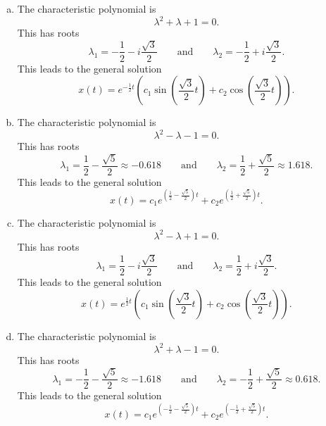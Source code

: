 \documentclass[12pt]{article} %
\begin{document}
\begin{solution}
    \begin{enumerate}[(a)]~
        \item The characteristic polynomial is 
         \[
\lambda^2+\lambda+1=0.
\]
 This has roots
        \[
            \lambda_1 = -\frac{1}{2} -i\frac{\sqrt{3}}{2} \qquad \textrm{and} \qquad \lambda_2 = -\frac{1}{2} + i\frac{\sqrt{3}}{2}.
        \]
    This leads to the general solution
        \[
            \boxed{x(t) = e^{-\frac{1}{2}t} \left(c_1 \sin\left(\frac{\sqrt{3}}{2}t\right) +c_2 \cos\left(\frac{\sqrt{3}}{2}t\right) \right).}
        \]

        \item The characteristic polynomial is 
        \[
            \lambda^2-\lambda-1=0.
        \]
         This has roots
        \[
            \lambda_1 = \frac{1}{2} -\frac{\sqrt{5}}{2} \approx -0.618 \qquad \textrm{and} \qquad \lambda_2 = \frac{1}{2} + \frac{\sqrt{5}}{2} \approx 1.618.
        \]
    This leads to the general solution
        \[
            \boxed{x(t) = c_1 e^{\left(\frac{1}{2}-\frac{\sqrt{5}}{2}\right)t}  +c_2 e^{\left(\frac{1}{2}+\frac{\sqrt{5}}{2}\right)t}.}
        \]

        \item The characteristic polynomial is 
         \[
\lambda^2-\lambda+1=0.
\]
 This has roots
        \[
            \lambda_1 = \frac{1}{2} -i\frac{\sqrt{3}}{2} \qquad \textrm{and} \qquad \lambda_2 = \frac{1}{2} + i\frac{\sqrt{3}}{2}.
        \]
    This leads to the general solution
        \[
            \boxed{x(t) = e^{\frac{1}{2}t} \left(c_1 \sin\left(\frac{\sqrt{3}}{2}t\right) +c_2 \cos\left(\frac{\sqrt{3}}{2}t\right) \right).}
        \]

        \item The characteristic polynomial is 
        \[
            \lambda^2+\lambda-1=0.
        \]
         This has roots
        \[
            \lambda_1 = -\frac{1}{2} -\frac{\sqrt{5}}{2} \approx -1.618 \qquad \textrm{and} \qquad \lambda_2 = -\frac{1}{2} + \frac{\sqrt{5}}{2} \approx 0.618.
        \]
    This leads to the general solution
        \[
            \boxed{x(t) = c_1 e^{\left(-\frac{1}{2}-\frac{\sqrt{5}}{2}\right)t}  +c_2 e^{\left(-\frac{1}{2}+\frac{\sqrt{5}}{2}\right)t}.}
        \]

    \end{enumerate}
\end{solution}

\newpage
\end{document}
